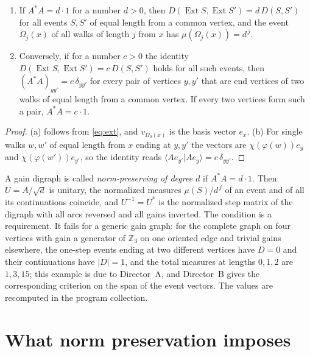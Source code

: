 \begin{lemma}\label{lem:cont}
\begin{enumerate}[label=(\alph*)]
\item If $A^*A=d\cdot1$ for a number $d>0$, then $D(\operatorname{Ext}S,\operatorname{Ext}S')=d\,D(S,S')$ for all events $S,S'$ of equal length from a common vertex, and the event $\Omega_j(x)$ of all walks of length $j$ from $x$ has $\mu(\Omega_j(x))=d^{\,j}$.
\item Conversely, if for a number $c>0$ the identity $D(\operatorname{Ext}S,\operatorname{Ext}S')=c\,D(S,S')$ holds for all such events, then $(A^*A)_{yy'}=c\,\delta_{yy'}$ for every pair of vertices $y,y'$ that are end vertices of two walks of equal length from a common vertex. If every two vertices form such a pair, $A^*A=c\cdot1$.
\end{enumerate}
\end{lemma}
\begin{proof}
(a) follows from \eqref{eq:ext}, and $v_{\Omega_0(x)}$ is the basis vector $e_x$. (b) For single walks $w,w'$ of equal length from $x$ ending at $y,y'$ the vectors are $\chi(\varphi(w))e_y$ and $\chi(\varphi(w'))e_{y'}$, so the identity reads $\langle Ae_{y'}|Ae_y\rangle=c\,\delta_{yy'}$.
\end{proof}

A gain digraph is called \emph{norm-preserving of degree $d$} if $A^*A=d\cdot1$. Then $U=A/\sqrt d$ is unitary, the normalized measures $\mu(S)/d^{\,j}$ of an event and of all its continuations coincide, and $U^{-1}=U^*$ is the normalized step matrix of the digraph with all arcs reversed and all gains inverted. The condition is a requirement. It fails for a generic gain graph: for the complete graph on four vertices with gain a generator of $\mathbb{Z}_3$ on one oriented edge and trivial gains elsewhere, the one-step events ending at two different vertices have $D=0$ and their continuations have $|D|=1$, and the total measures at lengths $0,1,2$ are $1,3,15$; this example is due to Director~A, and Director~B gives the corresponding criterion on the span of the event vectors. The values are recomputed in the program collection.

\section{What norm preservation imposes}\label{sec:impose}


